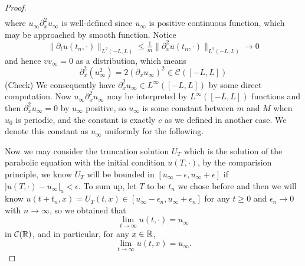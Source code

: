 \begin{proof}
\[\begin{aligned}
\end{aligned}
\]
where $u_{\infty}\partial_x^2 u_{\infty}$ is well-defined since $u_{\infty}$ is positive continuous function, which may be approached by smooth function. Notice
\[
\lVert \partial_t u(t_n,\cdot)\rVert_{L^2(-L,L)} \leq \tfrac1m \lVert\partial_x^2 u(t_n,\cdot)\rVert_{L^2(-L,L)} \to 0 
\]
and hence $vv_{\infty} = 0$ as a distribution, which means 
\[
\partial_x^2 (u_{\infty}^2) = 2 (\partial_x u_{\infty})^2 \in \mathcal{C}([-L,L])
\]
(Check) We consequently have $\partial_x^2 u_{\infty} \in L^{\infty}([-L,L])$ by some direct computation. Now $u_{\infty}\partial_x^2 u_{\infty}$ may be interpreted by $L^{\infty}([-L,L])$ functions and then $\partial_x^2 u_{\infty} = 0$ by $u_{\infty}$ positive, so $u_{\infty}$ is some constant between $m$ and $M$ when $u_0$ is periodic, and the constant is exactly $c$ as we defined in another case. We denote this constant as $u_{\infty}$ uniformly for the following.

Now we may consider the truncation solution $U_T$ which is the solution of the parabolic equation with the initial condition $u(T,\cdot)$, by the comparision principle, we know $U_T$ will be bounded in $[u_{\infty} -\epsilon, u_{\infty} + \epsilon]$ if $|u(T,\cdot) - u_{\infty}|_u < \epsilon$. To sum up, let $T$ to be $t_n$ we chose before and then we will know $u(t+t_n,x) = U_T(t,x) \in [u_{\infty} - \epsilon_n, u_{\infty} + \epsilon_n]$ for any $t\geq 0$ and $\epsilon_n \to 0$ with $n\to\infty$, so we obtained that \[ \lim_{t\to\infty} u(t,\cdot) = u_{\infty}\] in $\mathcal{C}(\mathbb{R})$, and in particular, for any $x\in \mathbb{R}$, \[\lim_{t\to\infty} u(t,x) = u_{\infty}.\]
\end{proof}

